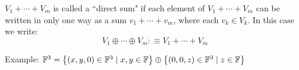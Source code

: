 \setcounter{thm}{40}
\begin{mydef}
  \label{def: direct sum}
  $V_1 + \cdots + V_m$ is called a ``direct sum" if each element of $V_1 +\cdots+V_m$ can be written in only one way as a sum $v_1 + \cdots + v_m$, where each $v_k \in V_k$. In this case we write:
  \begin{equation}
    V_1 \oplus \cdots \oplus V_m :\equiv V_1 + \cdots + V_m
  \end{equation}
\end{mydef}

\begin{example}
  Example: $\mathbb{F}^3 =
  \left \{ \left ( x, y, 0 \right ) \in \mathbb{F}^3 \mid x,y \in \mathbb{F} \right \}
  \oplus
  \left \{ \left (  0, 0, z  \right ) \in \mathbb{F}^3 \mid z \in \mathbb{F} \right \}$
\end{example}


